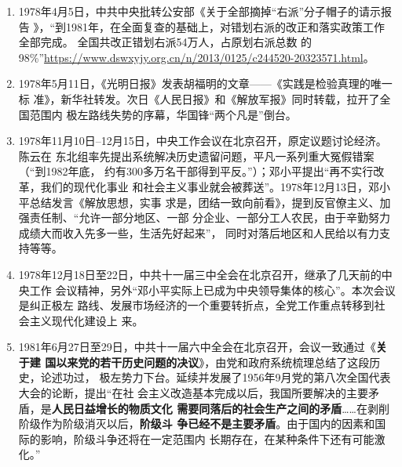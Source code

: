 \begin{enumerate}
\item 1978年4月5日，中共中央批转公安部《关于全部摘掉“右派”分子帽子的请示报告
  》，“到1981年，在全面复查的基础上，对错划右派的改正和落实政策工作全部完成。
  全国共改正错划右派54万人，占原划右派总数
  的98\%”\url{https://www.dswxyjy.org.cn/n/2013/0125/c244520-20323571.html}。

\item 1978年5月11日，《光明日报》发表胡福明的文章——《实践是检验真理的唯一标
  准》，新华社转发。次日《人民日报》和《解放军报》同时转载，拉开了全国范围内
  极左路线失势的序幕，华国锋“两个凡是”倒台。


\item 1978年11月10日--12月15日，中央工作会议在北京召开，原定议题讨论经济。陈云在
  东北组率先提出系统解决历史遗留问题，平凡一系列重大冤假错案（“到1982年底，
  约有300多万名干部得到平反。”）；邓小平提出“再不实行改革，我们的现代化事业
  和社会主义事业就会被葬送”。1978年12月13日，邓小平总结发言《解放思想，实事
  求是，团结一致向前看》，提到反官僚主义、加强责任制、“允许一部分地区、一部
  分企业、一部分工人农民，由于辛勤努力成绩大而收入先多一些，生活先好起来”，
  同时对落后地区和人民给以有力支持等等。

\item 1978年12月18日至22日，中共十一届三中全会在北京召开，继承了几天前的中央工作
  会议精神，另外“邓小平实际上已成为中央领导集体的核心”。本次会议是纠正极左
  路线、发展市场经济的一个重要转折点，全党工作重点转移到社会主义现代化建设上
  来。

\item 1981年6月27日至29日，中共十一届六中全会在北京召开，会议一致通过《\textbf{关于建
    国以来党的若干历史问题的决议}》，由党和政府系统梳理总结了这段历史，论述功过，
  极左势力下台。延续并发展了1956年9月党的第八次全国代表大会的论断，提出“在社
  会主义改造基本完成以后，我国所要解决的主要矛盾，是\textbf{人民日益增长的物质文化
    需要同落后的社会生产之间的矛盾}……在剥削阶级作为阶级消灭以后，\textbf{阶级斗
    争已经不是主要矛盾}。由于国内的因素和国际的影响，阶级斗争还将在一定范围内
  长期存在，在某种条件下还有可能激化。”


\end{enumerate}

